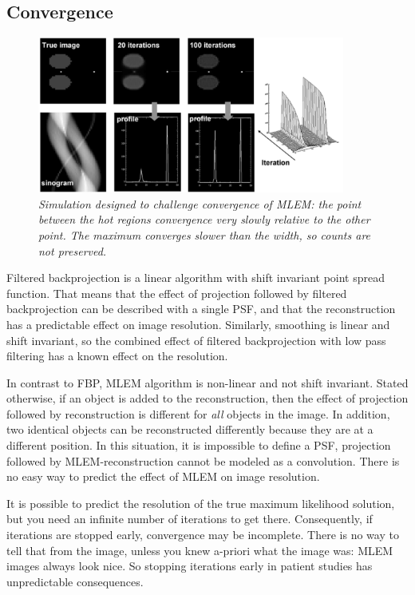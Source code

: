 \documentclass[11pt,oneside]{book}
\begin{document}
\subsection{Convergence} \label{sec:mlemconverge}
\begin{figure}[tb]
\centering
\includegraphics[width=0.9\textwidth]{figs/fig_mlem_converge.pdf}
\caption{\label{fig:mlem_converge} \emph{Simulation designed to challenge
convergence of MLEM: the point between the hot regions convergence very slowly
relative to the other point. The maximum converges slower than the width, so
counts are not preserved.}}
\end{figure}
%
Filtered backprojection is a linear algorithm with shift invariant point
spread function. That means that the effect of projection followed by filtered
backprojection can be described with a single PSF, and that the reconstruction
has a predictable effect on image resolution. Similarly, smoothing is linear
and shift invariant, so the combined effect of filtered backprojection with
low pass filtering has a known effect on the resolution.

In contrast to FBP, MLEM algorithm is non-linear and not shift invariant.
Stated otherwise, if an object is added to the reconstruction, then the effect
of projection followed by reconstruction is different for {\em all} objects in
the image. In addition, two identical objects can be reconstructed differently
because they are at a different position. In this situation, it is impossible
to define a PSF, projection followed by MLEM-reconstruction cannot be modeled
as a convolution. There is no easy way to predict the effect of MLEM on image
resolution. 

It is possible to predict the resolution of the true maximum likelihood
solution, but you need an infinite number of iterations to get
there. Consequently, if iterations are stopped early, convergence may be
incomplete. There is no way to tell that from the image, unless you knew
a-priori what the image was: MLEM images always look nice. So stopping
iterations early in patient studies has unpredictable consequences.
\end{document}
